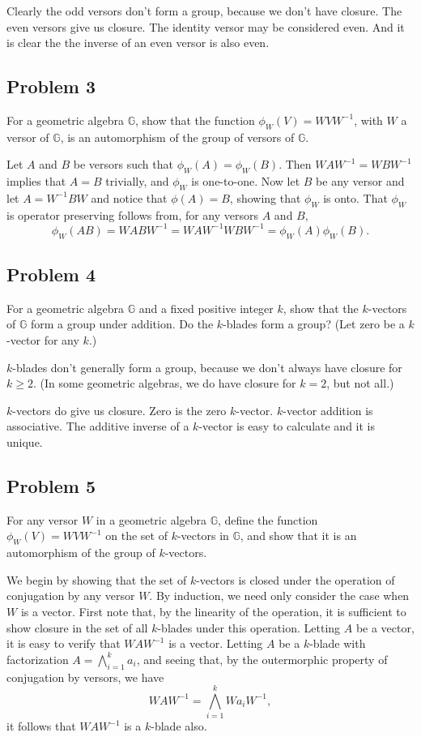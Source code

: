 \documentclass[12pt]{article}
\newcommand{\G}{\mathbb{G}}
\begin{document}
Clearly the odd versors don't form a group, because we don't have closure.
The even versors give us closure.  The identity versor may be considered even.
And it is clear the the inverse of an even versor is also even.

\subsection*{Problem 3}

For a geometric algebra $\G$, show that
the function $\phi_W(V)=WVW^{-1}$, with $W$ a versor of $\G$,
is an automorphism of the group of versors of $\G$.

Let $A$ and $B$ be versors such that $\phi_W(A)=\phi_W(B)$.
Then $WAW^{-1}=WBW^{-1}$ implies that $A=B$ trivially, and
$\phi_W$ is one-to-one.  Now let $B$ be any versor and
let $A=W^{-1}BW$ and notice that $\phi(A)=B$, showing that
$\phi_W$ is onto.  That $\phi_W$ is operator preserving follows
from, for any versors $A$ and $B$,
\begin{equation*}
\phi_W(AB)=WABW^{-1}=WAW^{-1}WBW^{-1}=\phi_W(A)\phi_W(B).
\end{equation*}

\subsection*{Problem 4}

For a geometric algebra $\G$ and a fixed positive integer $k$, show that the $k$-vectors of $\G$
form a group under addition.  Do the $k$-blades form a group?  (Let zero be a $k$-vector for any $k$.)

$k$-blades don't generally form a group, because we don't always have closure for $k\geq 2$.
(In some geometric algebras, we do have closure for $k=2$, but not all.)

$k$-vectors do give us closure.  Zero is the zero $k$-vector.  $k$-vector addition is associative.
The additive inverse of a $k$-vector is easy to calculate and it is unique.

\subsection*{Problem 5}

For any versor $W$ in a geometric algebra $\G$, define
the function $\phi_W(V)=WVW^{-1}$ on the set of $k$-vectors in $\G$,
and show that it is an automorphism of the group of $k$-vectors.

We begin by showing that the set of $k$-vectors is closed under
the operation of conjugation by any versor $W$.  By induction,
we need only consider the case when $W$ is a vector.
First note that, by the linearity of the operation, it is sufficient
to show closure in the set of all $k$-blades under this operation.
Letting $A$ be a vector, it is easy to verify that $WAW^{-1}$ is a vector.
Letting $A$ be a $k$-blade with factorization $A=\bigwedge_{i=1}^k a_i$,
and seeing that, by the outermorphic property of conjugation by versors,
we have
\begin{equation*}
WAW^{-1}=\bigwedge_{i=1}^k Wa_iW^{-1},
\end{equation*}
it follows that $WAW^{-1}$ is a $k$-blade also.
\end{document}
